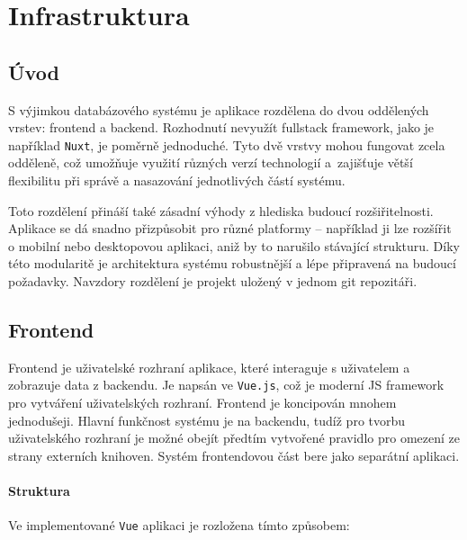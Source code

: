 \chapter{Infrastruktura}

\section{Úvod}
S výjimkou databázového systému je aplikace rozdělena do dvou oddělených vrstev: frontend a backend. Rozhodnutí nevyužít fullstack framework, jako je například \texttt{Nuxt}\cite{nuxtIntroductionStarted}, je poměrně jednoduché. Tyto dvě vrstvy mohou fungovat zcela odděleně, což umožňuje využití různých verzí technologií a~zajišťuje větší flexibilitu při správě a nasazování jednotlivých částí systému.

Toto rozdělení přináší také zásadní výhody z hlediska budoucí rozšiřitelnosti. Aplikace se dá snadno přizpůsobit pro různé platformy – například ji lze rozšířit o mobilní nebo desktopovou aplikaci, aniž by to narušilo stávající strukturu. Díky této modularitě je architektura systému robustnější a lépe připravená na budoucí požadavky. Navzdory rozdělení je projekt uložený v jednom git repozitáři.





\section{Frontend}
Frontend je uživatelské rozhraní aplikace, které interaguje s uživatelem a zobrazuje data z backendu. Je napsán ve \texttt{Vue.js}, což je moderní JS framework pro vytváření uživatelských rozhraní. Frontend je koncipován mnohem jednodušeji. Hlavní funkčnost systému je na backendu, tudíž pro tvorbu uživatelského rozhraní je možné obejít předtím vytvořené pravidlo pro omezení ze strany externích knihoven. Systém frontendovou část bere jako separátní aplikaci.

\subsubsection{Struktura}
Ve implementované \texttt{Vue} aplikaci je rozložena tímto způsobem:



